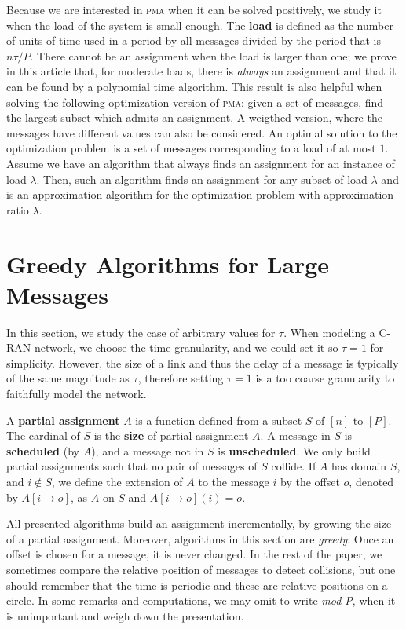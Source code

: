 \documentclass[a4paper,UKenglish,cleveref, autoref, thm-restate]{lipics-v2019}
\newcommand\pma{\textsc{pma}\xspace}
\begin{document}
Because we are interested in \pma when it can be solved positively, we study it when the load of the system is small enough. The \textbf{load} is defined as the number of units of time used in a period by all messages divided by the period that is $n\tau /P$. There cannot be an assignment when the load is larger than one; we prove in this article that, for moderate loads, there is \emph{always} an assignment and that it can be found by a polynomial time algorithm. This result is also helpful when solving the following optimization version of \pma: given a set of messages, find the largest subset 
which admits an assignment. A weigthed version, where the messages have different values can also be considered. An optimal solution to the optimization problem is a set of messages corresponding to a load of at most $1$. Assume we have an algorithm that always finds an assignment for an instance of load $\lambda$. Then, such an algorithm finds an assignment for any subset of load $\lambda$
and is an approximation algorithm for the optimization problem with approximation ratio $\lambda$.


\section{Greedy Algorithms for Large Messages} \label{sec:large}

In this section, we study the case of arbitrary values for $\tau$. When modeling a C-RAN network,
we choose the time granularity, and we could set it so $\tau = 1$ for simplicity. However, the size of a link and thus the delay of a message
is typically of the same magnitude as $\tau$, therefore setting $\tau = 1$ is a too coarse granularity to faithfully model the network.

A \textbf{partial assignment} $A$ is a function defined from a subset $S$ of $[n]$ to $[P]$.
The cardinal of $S$ is the \textbf{size} of partial assignment $A$. A message in $S$ is \textbf{scheduled} (by $A$), and a message not in $S$ is \textbf{unscheduled}. We only build partial assignments such that no pair of messages of $S$ collide. If $A$ has domain $S$, and $i \notin S$, we define the extension of $A$ to the message $i$ by the offset $o$, denoted by $A[i \rightarrow o]$, as $A$ on $S$ and $A[i \rightarrow o](i) = o$.

All presented algorithms build an assignment incrementally, by growing the size of a partial assignment. Moreover, algorithms in this section are \emph{greedy}: Once an offset is chosen for a message, it is never changed. In the rest of the paper, we sometimes compare the relative position of messages to detect collisions, but one should remember that the time is periodic and these are relative positions on a circle. 
In some remarks and computations, we may omit to write \emph{mod P}, when it is unimportant and weigh down the presentation.
\end{document}
